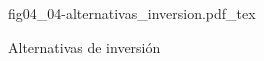 \begin{figure}[h]
\centering
\def\svgwidth{0.5\textwidth}
{fig04_04-alternativas_inversion.pdf_tex}
\caption{Alternativas de inversión}
\label{fig04_04-alternativas_inversion}
\end{figure}